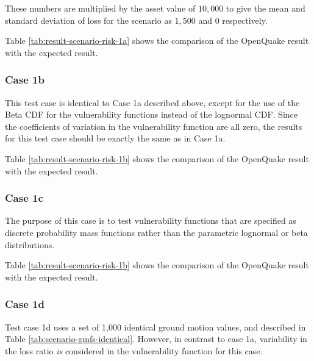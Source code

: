 These numbers are multiplied by the asset value of $10,000$ to give the mean and standard deviation of loss for the scenario as $1,500$ and $0$ respectively.



Table \ref{tab:result-scenario-risk-1a} shows the comparison of the OpenQuake result with the expected result.

\subsubsection{Case 1b}
This test case is identical to Case 1a described above, except for the use of the Beta CDF for the vulnerability functions instead of the lognormal CDF. Since the coefficients of variation in the vulnerability function are all zero, the results for this test case should be exactly the same as in Case 1a.



Table \ref{tab:result-scenario-risk-1b} shows the comparison of the OpenQuake result with the expected result.

\subsubsection{Case 1c}
The purpose of this case is to test vulnerability functions that are specified as discrete probability mass functions rather than the parametric lognormal or beta distributions.



Table \ref{tab:result-scenario-risk-1b} shows the comparison of the OpenQuake result with the expected result.

\subsubsection{Case 1d}
Test case 1d uses a set of 1,000 identical ground motion values, and described in Table \ref{tab:scenario-gmfs-identical}. However, in contrast to case 1a, variability in the loss ratio \emph{is} considered in the vulnerability function for this case.



